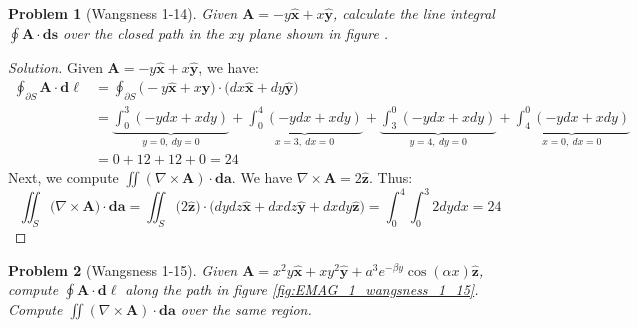 \documentclass[oneside]{book}
\theoremstyle{mystyle}
\newtheorem{problem}{Problem}[section]
\begin{document}
\begin{problem}[Wangsness 1-14]
\label{problem:EMAG_1_wangsness_1_14}
Given $\mathbf{A} = -y\hat{\mathbf{x}}+x\hat{\mathbf{y}}$, calculate the line integral $\oint \mathbf{A}\cdot \mathbf{ds}$ over the closed path in the $xy$ plane shown in figure .
\end{problem}
\begin{proof}[Solution]
Given $\mathbf{A} = -y\hat{\mathbf{x}}+x\hat{\mathbf{y}}$, we have:
\begin{align*}
    \oint_{\partial S}\mathbf{A}\cdot\boldsymbol{d\ell}&=\oint_{\partial S}\big(-y\hat{\mathbf{x}}+x\hat{\mathbf{y}}\big)\cdot\big(dx\hat{\mathbf{x}}+dy\hat{\mathbf{y}}\big)\\
    &=\underbrace{\int_{0}^{3}(-ydx+xdy)}_{y=0,\ dy=0}+\underbrace{\int_{0}^{4}(-ydx+xdy)}_{x=3,\ dx=0}+\underbrace{\int_{3}^{0}(-ydx+xdy)}_{y =4,\ dy=0}+\underbrace{\int_{4}^{0}(-ydx+xdy)}_{x=0,\ dx=0}\\
    &=0+12+12+0=24
\end{align*}
Next, we compute $\iint(\nabla\times\mathbf{A})\cdot\boldsymbol{da}$. We have $\nabla\times\mathbf{A}=2\hat{\mathbf{z}}$. Thus:
\begin{equation*}
    \iint_{S}\big(\nabla\times\mathbf{A}\big)\cdot\boldsymbol{da}=\iint_{S}\big(2\hat{\mathbf{z}}\big)\cdot \big(dydz\hat{\mathbf{x}}+dxdz\hat{\mathbf{y}}+dxdy\hat{\mathbf{z}}\big)=\int_{0}^{4}\int_{0}^{3}2dydx=24
\end{equation*}
\end{proof}
\begin{problem}[Wangsness 1-15]
\label{problem:EMAG_1_wangsness_1_15}
Given $\mathbf{A} = x^{2}y\hat{\mathbf{x}}+xy^{2}\hat{\mathbf{y}}+a^{3}e^{-\beta y}\cos(\alpha x)\hat{\mathbf{z}}$, compute $\oint \mathbf{A}\cdot \boldsymbol{d\ell}$ along the path in figure \ref{fig:EMAG_1_wangsness_1_15}. Compute $\iint (\nabla \times \mathbf{A})\cdot \boldsymbol{da}$ over the same region.
\end{problem}
\end{document}
